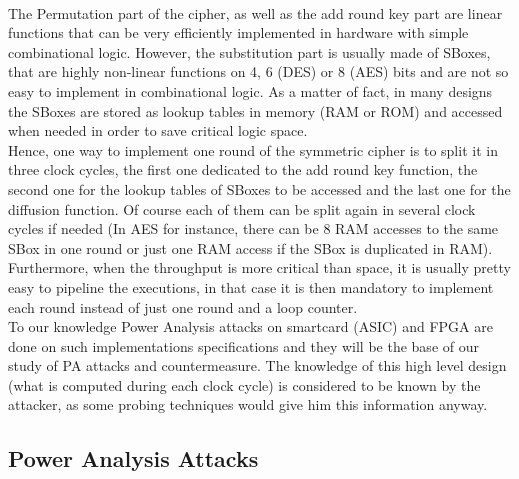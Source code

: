 \documentclass[11pt,a4paper]{article}
\begin{document}
\paragraph{}
The Permutation part of the cipher, as well as the add round key part are linear functions that can be very efficiently implemented in hardware with simple combinational logic. 
However, the substitution part is usually made of SBoxes, that are highly non-linear functions on 4, 6 (DES) or 8 (AES) bits and are not so easy to implement in combinational 
logic. As a matter of fact, in many designs the SBoxes are stored as lookup tables in memory (RAM or ROM) and accessed when needed in order to save critical logic space. \\
Hence, one way to implement one round of the symmetric cipher is to split it in three clock cycles, the first one dedicated to the add round key function, the second one for
the lookup tables of SBoxes to be accessed and the last one for the diffusion function. Of course each of them can be split again in several clock cycles if needed (In AES for instance,
there can be 8 RAM accesses to the same SBox in one round or just one RAM access if the SBox is duplicated in RAM). \\
Furthermore, when the throughput is more critical than space, it is usually pretty easy to pipeline the executions, in that case it is then mandatory to implement each round 
instead of just one round and a loop counter. \\
To our knowledge Power Analysis attacks on smartcard (ASIC) and FPGA are done on such implementations specifications and they will be the base of our study of PA attacks and countermeasure. 
The knowledge of this high level design (what is computed during each clock cycle) is considered to be known by the attacker, as some probing techniques would give him this information 
anyway.

\subsection{Power Analysis Attacks}
\label{subsec:PAA}
\end{document}
